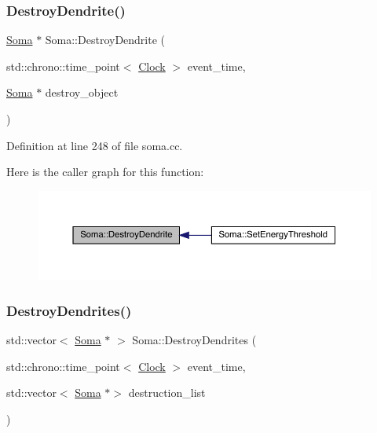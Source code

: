 \subsubsection{\texorpdfstring{Destroy\+Dendrite()}{DestroyDendrite()}}
{\footnotesize\ttfamily \hyperlink{class_soma}{Soma} $\ast$ Soma\+::\+Destroy\+Dendrite (\begin{DoxyParamCaption}\item[{std\+::chrono\+::time\+\_\+point$<$ \hyperlink{universe_8h_a0ef8d951d1ca5ab3cfaf7ab4c7a6fd80}{Clock} $>$}]{event\+\_\+time,  }\item[{\hyperlink{class_soma}{Soma} $\ast$}]{destroy\+\_\+object }\end{DoxyParamCaption})}



Definition at line 248 of file soma.\+cc.

Here is the caller graph for this function\+:
\nopagebreak
\begin{figure}[H]
\begin{center}
\leavevmode
\includegraphics[width=350pt]{class_soma_a086cb5a05e82f6f58ac0bd8403e25e07_icgraph}
\end{center}
\end{figure}
\mbox{\label{class_soma_ac549a7caf885fdc0ac3a6adf393430af}} 
\subsubsection{\texorpdfstring{Destroy\+Dendrites()}{DestroyDendrites()}}
{\footnotesize\ttfamily std\+::vector$<$ \hyperlink{class_soma}{Soma} $\ast$ $>$ Soma\+::\+Destroy\+Dendrites (\begin{DoxyParamCaption}\item[{std\+::chrono\+::time\+\_\+point$<$ \hyperlink{universe_8h_a0ef8d951d1ca5ab3cfaf7ab4c7a6fd80}{Clock} $>$}]{event\+\_\+time,  }\item[{std\+::vector$<$ \hyperlink{class_soma}{Soma} $\ast$$>$}]{destruction\+\_\+list }\end{DoxyParamCaption})}



